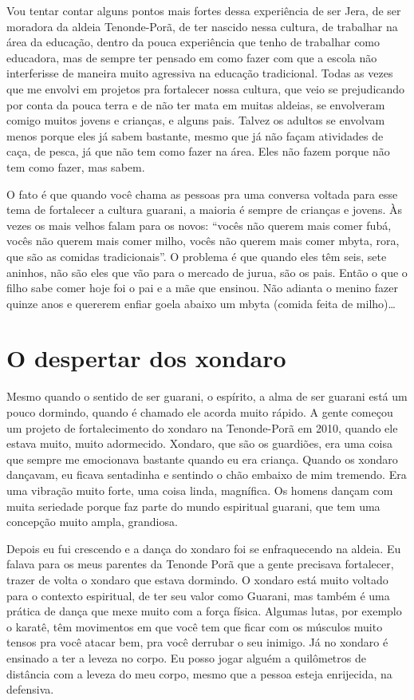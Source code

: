Vou tentar contar alguns pontos mais fortes dessa experiência de ser
Jera, de ser moradora da aldeia Tenonde-Porã, de ter nascido nessa
cultura, de trabalhar na área da educação, dentro da pouca experiência
que tenho de trabalhar como educadora, mas de sempre ter pensado em como
fazer com que a escola não interferisse de maneira muito agressiva na
educação tradicional. Todas as vezes que me envolvi em projetos pra
fortalecer nossa cultura, que veio se prejudicando por conta da pouca
terra e de não ter mata em muitas aldeias, se envolveram comigo muitos
jovens e crianças, e alguns pais. Talvez os adultos se envolvam menos
porque eles já sabem bastante, mesmo que já não façam atividades de
caça, de pesca, já que não tem como fazer na área. Eles não fazem
porque não tem como fazer, mas sabem.

O fato é que quando você chama as pessoas pra uma conversa voltada para
esse tema de fortalecer a cultura guarani, a maioria é sempre de
crianças e jovens. Às vezes os mais velhos falam para os novos: ``vocês
não querem mais comer fubá, vocês não querem mais comer milho, vocês
não querem mais comer mbyta, rora, que são as comidas tradicionais''. O
problema é que quando eles têm seis, sete aninhos, não são eles que vão
para o mercado de jurua, são os pais. Então o que o filho sabe comer
hoje foi o pai e a mãe que ensinou. Não adianta o menino fazer quinze
anos e quererem enfiar goela abaixo um mbyta (comida feita de milho)\ldots{}

\section{O despertar dos xondaro}

Mesmo quando o sentido de ser guarani, o espírito, a alma de ser guarani
está um pouco dormindo, quando é chamado ele acorda muito rápido. A
gente começou um projeto de fortalecimento do xondaro na Tenonde-Porã
em 2010, quando ele estava muito, muito adormecido. Xondaro, que são os
guardiões, era uma coisa que sempre me emocionava bastante quando eu
era criança. Quando os xondaro dançavam, eu ficava sentadinha e
sentindo o chão embaixo de mim tremendo. Era uma vibração muito forte,
uma coisa linda, magnífica. Os homens dançam com muita seriedade porque
faz parte do mundo espiritual guarani, que tem uma concepção muito
ampla, grandiosa.

Depois eu fui crescendo e a dança do xondaro foi se enfraquecendo na
aldeia. Eu falava para os meus parentes da Tenonde Porã que a gente
precisava fortalecer, trazer de volta o xondaro que estava dormindo. O
xondaro está muito voltado para o contexto espiritual, de ter seu valor
como Guarani, mas também é uma prática de dança que mexe muito com a
força física. Algumas lutas, por exemplo o karatê, têm movimentos em
que você tem que ficar com os músculos muito tensos pra você atacar
bem, pra você derrubar o seu inimigo. Já no xondaro é ensinado a ter a
leveza no corpo. Eu posso jogar alguém a quilômetros de distância com a
leveza do meu corpo, mesmo que a pessoa esteja enrijecida, na
defensiva.

